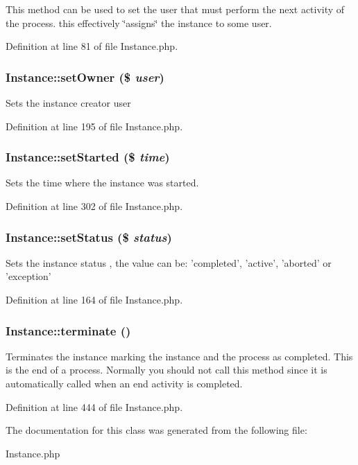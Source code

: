 This method can be used to set the user that must perform the next activity of the process. this effectively \char`\"{}assigns\char`\"{} the instance to some user. 

Definition at line 81 of file Instance.php.
\subsubsection{\setlength{\rightskip}{0pt plus 5cm}Instance::set\-Owner (\$ {\em user})}\label{classInstance_a12}


Sets the instance creator user 

Definition at line 195 of file Instance.php.
\subsubsection{\setlength{\rightskip}{0pt plus 5cm}Instance::set\-Started (\$ {\em time})}\label{classInstance_a19}


Sets the time where the instance was started. 

Definition at line 302 of file Instance.php.
\subsubsection{\setlength{\rightskip}{0pt plus 5cm}Instance::set\-Status (\$ {\em status})}\label{classInstance_a8}


Sets the instance status , the value can be: 'completed', 'active', 'aborted' or 'exception' 

Definition at line 164 of file Instance.php.
\subsubsection{\setlength{\rightskip}{0pt plus 5cm}Instance::terminate ()}\label{classInstance_a24}


Terminates the instance marking the instance and the process as completed. This is the end of a process. Normally you should not call this method since it is automatically called when an end activity is completed. 

Definition at line 444 of file Instance.php.

The documentation for this class was generated from the following file:\begin{CompactItemize}
\item 
Instance.php\end{CompactItemize}

